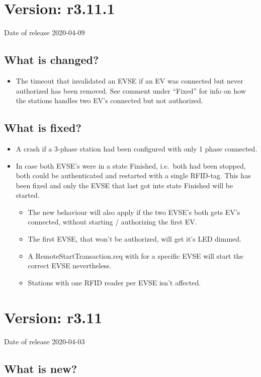 \documentclass{scrartcl}
\begin{document}
\section{Version: r3.11.1}
Date of release 2020-04-09
\subsection*{What is changed?}
\begin{itemize}
\item The timeout that invalidated an EVSE if an EV was connected but never
  authorized has been removed. See comment under ``Fixed'' for info on how the
  stations handles two EV's connected but not authorized.
\end{itemize}
\subsection*{What is fixed?}
\begin{itemize}
\item A crash if a 3-phase station had been configured with only 1 phase
  connected.
\item In case both EVSE's were in a state Finished, i.e.\ both had been
  stopped, both could be authenticated and restarted with a single
  RFID-tag. This has been fixed and only the EVSE that last got inte state
  Finished will be started.
  \begin{itemize}
  \item The new behaviour will also apply if the two EVSE's both gets EV's
    connected, without starting / authorizing the first EV.
  \item The first EVSE, that won't be authorized, will get it's LED dimmed.
  \item A RemoteStartTransaction.req with for a specific EVSE will start the
    correct EVSE nevertheless.
  \item Stations with one RFID reader per EVSE isn't affected.
  \end{itemize}
\end{itemize}

\section{Version: r3.11}
Date of release 2020-04-03

\subsection*{What is new?}
\end{document}
